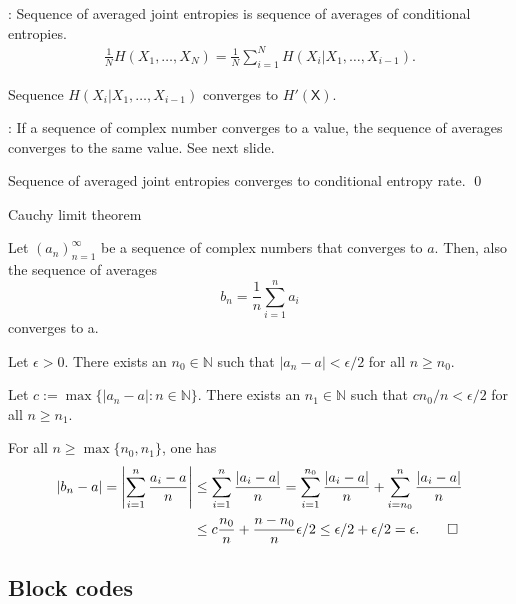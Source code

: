 \begin{frame}
\bit
\item {}: Sequence of averaged joint entropies is sequence of averages of conditional entropies.
\begin{align*}
\frac{1}{N}H(X_1,\dots,X_N)=\frac{1}{N}\sum_{i=1}^NH(X_i|X_{1},\dots,X_{i-1}).
\end{align*}
\item {} Sequence $H(X_i|X_1,\dots,X_{i-1})$ converges to $H'(\mathsf{X})$.
\item {}: If a sequence of complex number converges to a value, the sequence of averages converges to the same value. See next slide.
\item [\iarrow] Sequence of averaged joint entropies converges to conditional entropy rate. 
\qed
\eit
\end{frame}



\begin{frame}{Cauchy limit theorem}
\begin{lemma}
Let $(a_n)_{n=1}^{\infty}$ be a sequence of complex numbers that converges to $a$. Then, also the sequence of averages 
\[
b_n=\frac{1}{n}\sum_{i=1}^na_i
\]
converges to a. 
\end{lemma}
 Let $\epsilon>0$. There exists an $n_0\in\mathbb{N}$ such that $|a_n-a|<\epsilon/2$ for all $n\geq n_0$.
\bit
\item Let $c:=\max\{|a_n-a|\colon n\in\mathbb{N}\}$. There exists an $n_1\in\mathbb{N}$ such that $cn_0/n<\epsilon/2$ for all $n\geq n_1$.
 \item[\iarrow] For all $n\geq \max\{n_0,n_1\}$, one has 
\begin{align*}
|b_n-a|=\left|\sum_{i=1}^n\frac{a_i-a}{n}\right|&\leq \sum_{i=1}^n\frac{|a_i-a|}{n}=
\sum_{i=1}^{n_0}\frac{|a_i-a|}{n}+\sum_{i=n_0}^n\frac{|a_i-a|}{n}
 \\ &\leq c\frac{n_0}{n}+\frac{n-n_0}{n}\epsilon/2 \leq \epsilon/2+\epsilon/2=\epsilon. \qed
\end{align*}
\eit 
\end{frame}


\subsection{Block codes}

